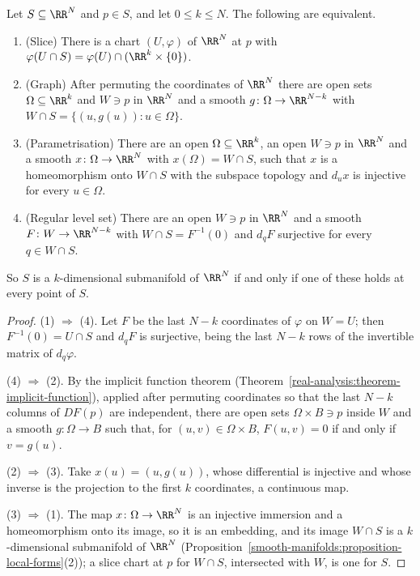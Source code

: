 \begin{proposition}\label{smooth-manifolds:proposition-submanifold-criteria}
Let $S \subseteq \RR^N$ and $p \in S$, and let $0 \leq k \leq N$. The following are equivalent.
\begin{enumerate}
\item (Slice) There is a chart $(U, \varphi)$ of $\RR^N$ at $p$ with $\varphi(U \cap S) = \varphi(U) \cap (\RR^k \times \{0\})$.
\item (Graph) After permuting the coordinates of $\RR^N$ there are open sets $\Omega \subseteq \RR^k$ and $W \ni p$ in $\RR^N$ and a smooth
$g \colon \Omega \to \RR^{N-k}$ with $W \cap S = \{(u, g(u)) : u \in \Omega\}$.
\item (Parametrisation) There are an open $\Omega \subseteq \RR^k$, an open $W \ni p$ in $\RR^N$ and a smooth $x \colon \Omega \to \RR^N$ with $x(\Omega) = W \cap S$,
such that $x$ is a homeomorphism onto $W \cap S$ with the subspace topology and $d_ux$ is injective for every $u \in \Omega$.
\item (Regular level set) There are an open $W \ni p$ in $\RR^N$ and a smooth $F \colon W \to \RR^{N-k}$ with $W \cap S = F^{-1}(0)$ and $d_qF$ surjective for every
$q \in W \cap S$.
\end{enumerate}
So $S$ is a $k$-dimensional submanifold of $\RR^N$ if and only if one of these holds at every point of $S$.
\end{proposition}

\begin{proof}
(1) $\Rightarrow$ (4). Let $F$ be the last $N - k$ coordinates of $\varphi$ on $W = U$; then $F^{-1}(0) = U \cap S$ and $d_qF$ is surjective, being the last $N - k$
rows of the invertible matrix of $d_q\varphi$.

(4) $\Rightarrow$ (2). By the implicit function theorem (Theorem~\ref{real-analysis:theorem-implicit-function}), applied after permuting coordinates so that the
last $N - k$ columns of $DF(p)$ are independent, there are open sets $\Omega \times B \ni p$ inside $W$ and a smooth $g \colon \Omega \to B$ such that, for
$(u, v) \in \Omega \times B$, $F(u, v) = 0$ if and only if $v = g(u)$.

(2) $\Rightarrow$ (3). Take $x(u) = (u, g(u))$, whose differential is injective and whose inverse is the projection to the first $k$ coordinates, a continuous
map.

(3) $\Rightarrow$ (1). The map $x \colon \Omega \to \RR^N$ is an injective immersion and a homeomorphism onto its image, so it is an embedding, and its image
$W \cap S$ is a $k$-dimensional submanifold of $\RR^N$ (Proposition~\ref{smooth-manifolds:proposition-local-forms}(2)); a slice chart at $p$ for $W \cap S$,
intersected with $W$, is one for $S$.
\end{proof}

